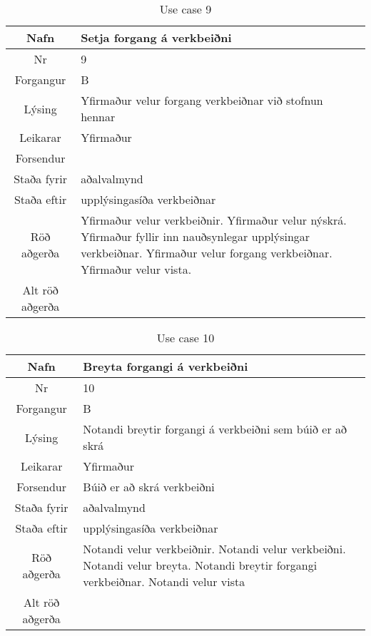 \begin{table}[h!]\centering
\begin{tabular}{|c|p{10cm}|}
\hline
Nafn&Setja forgang á verkbeiðni\\
\hline
Nr&9\\
\hline
Forgangur&B\\
\hline
Lýsing&Yfirmaður velur forgang verkbeiðnar við stofnun hennar\\
\hline
Leikarar&Yfirmaður\\
\hline
Forsendur&\\
\hline
Staða fyrir&aðalvalmynd\\
\hline
Staða eftir&upplýsingasíða verkbeiðnar\\
\hline
Röð aðgerða&Yfirmaður velur verkbeiðnir. Yfirmaður velur nýskrá. Yfirmaður fyllir inn nauðsynlegar upplýsingar verkbeiðnar. Yfirmaður velur forgang verkbeiðnar. Yfirmaður velur vista.\\
\hline
Alt röð aðgerða&\\
\hline
\end{tabular}
\caption{Use case 9}\label{tab:use_case_9}
\end{table}
\begin{table}[h!]\centering
\begin{tabular}{|c|p{10cm}|}
\hline
Nafn&Breyta forgangi á verkbeiðni\\
\hline
Nr&10\\
\hline
Forgangur&B\\
\hline
Lýsing&Notandi breytir forgangi á verkbeiðni sem búið er að skrá\\
\hline
Leikarar&Yfirmaður\\
\hline
Forsendur&Búið er að skrá verkbeiðni\\
\hline
Staða fyrir&aðalvalmynd\\
\hline
Staða eftir&upplýsingasíða verkbeiðnar\\
\hline
Röð aðgerða&Notandi velur verkbeiðnir. Notandi velur verkbeiðni. Notandi velur breyta. Notandi breytir forgangi verkbeiðnar. Notandi velur vista\\
\hline
Alt röð aðgerða&\\
\hline
\end{tabular}
\caption{Use case 10}\label{tab:use_case_10}
\end{table}
